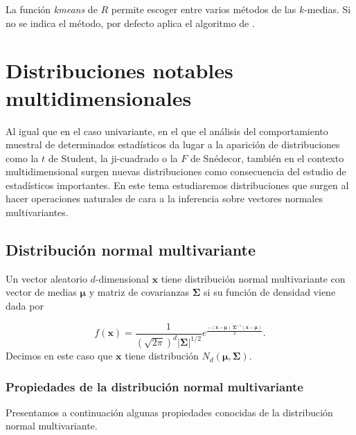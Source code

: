 \documentclass[
  a4paper,
  oneside]{scrbook}
\theoremstyle{definition}
\theoremstyle{definition}
\theoremstyle{definition}
\theoremstyle{definition}
\theoremstyle{remark}
\begin{document}
La función \emph{kmeans} de \(R\) permite escoger entre varios métodos de las
\(k\)-medias. Si no se indica el método, por defecto aplica el algoritmo
de \citet{Hartigan1979}.

\appendix


\chapter{Distribuciones notables multidimensionales}\label{anexoDist}

Al igual que en el caso univariante, en el que el análisis del
comportamiento muestral de determinados estadísticos da lugar a la
aparición de distribuciones como la \(t\) de Student, la ji-cuadrado o la
\(F\) de Snédecor, también en el contexto multidimensional surgen nuevas
distribuciones como consecuencia del estudio de estadísticos
importantes. En este tema estudiaremos distribuciones que surgen al
hacer operaciones naturales de cara a la inferencia sobre vectores
normales multivariantes.

\section{Distribución normal multivariante}\label{distribucion-normal-multivariante}

Un vector aleatorio \(d\)-dimensional \(\bm{x}\) tiene distribución normal
multivariante con vector de medias \(\bm{\mu}\) y matriz de covarianzas
\(\bm\Sigma\) si su función de densidad viene dada por

\[f(\bm{x})=\frac{1}{(\sqrt{2\pi})^d\left|\bm\Sigma\right|^{1/2}}e^\frac{{-(\bm{x}-\bm{\mu})^\prime\bm{\Sigma}^{-1}(\bm{x}-\bm{\mu})}}{2}.\]
Decimos en este caso que \(\bm{x}\) tiene distribución
\(N_d(\bm{\mu},\bm\Sigma)\).

\subsection{Propiedades de la distribución normal multivariante}\label{propiedades-de-la-distribucion-normal-multivariante}

Presentamos a continuación algunas propiedades conocidas de la
distribución normal multivariante.
\end{document}
